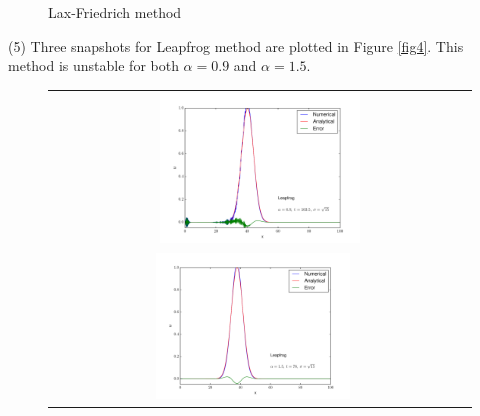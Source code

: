 \documentclass[11pt,letterpaper]{article}
\begin{document}
\begin{figure}[bth]
\begin{tabular}{cc}
\end{tabular}
\caption{Lax-Friedrich method}
\label{fig3}
\end{figure}

(5) Three snapshots for Leapfrog method are plotted in Figure \ref{fig4}. This method is unstable for both $\alpha=0.9$ and $\alpha=1.5$.

\begin{figure}[bth]
\centering
\begin{tabular}{cc}
    \multicolumn{2}{c}{ 
    	\includegraphics[width={0.49\textwidth}]{fig11.pdf}
    } \\
    \includegraphics[width={0.49\textwidth}]{fig9.pdf} &

\end{tabular}
\end{figure}
\end{document}
